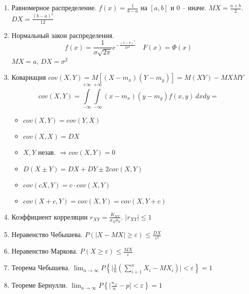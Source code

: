 \documentclass{article}
\begin{document}
\begin{multicols}{2}
\begin{enumerate}
    \item Равномерное распределение.
        $f(x) = \frac{1}{b-a}$ на $[a, b]$ и $0$ -- иначе.
        $MX = \frac{a+b}{2}$. $DX = \frac{(b-a)^2}{12}$
    \item Нормальный закон распределения.
        \[
        f(x) = \frac{1}{\sigma \sqrt{2\pi}} e^{- \frac{(x-a)^2}{2\sigma^2}}
        \quad
        F(x) = \Phi(x)
        \]
        $MX = a$, $DX = \sigma^2$
    \item Ковариация $cov(X, Y) = M[(X-m_x)(Y-m_y)] = M(XY) - MX MY$ 
        \[
            cov(X,Y) = \int\limits_{-\infty}^{+\infty}\int\limits_{-\infty}^{+\infty}(x-m_x)(y-m_y) f(x, y) \, dx dy =
        \]
        \begin{itemize}
            \item $ cov(X, Y) = cov(Y, X) $
            \item $ cov(X, X) = DX$
            \item $X, Y $ незав. $\Rightarrow cov(X, Y) = 0$
            \item $D(X \pm Y) = DX + DY \pm 2 cov(X, Y) $
            \item $cov(cX, Y) = c \cdot cov(X, Y)$
            \item $cov(X + c, Y) = cov(X, Y) = cov(X, Y + c)$
        \end{itemize}
    \item Коэффициент корреляции $r_{XY} = \frac{K_{XY}}{\sigma_X \sigma_Y}$.
        $|r_{XY}| \leq 1$
    \item Неравенство Чебышева. $P(|X - MX| \geq \varepsilon) \leq \frac{DX}{\varepsilon^2}$
    \item Неравенство Маркова. $P(X \geq \varepsilon) \leq \frac{MX}{\varepsilon}$
    \item Теорема Чебышева. $\lim_{n \to \infty} P\left\{ \Big|\frac{1}{n} \left(\sum_{i=1}^n X_i - MX_i \right)\Big| < \varepsilon \right\} = 1$
    \item Теореме Бернулли. $\lim_{n \to \infty} P \left\{ \Big| \frac{n_A}{n} - p \Big| < \varepsilon \right\} = 1$
    \end{enumerate}
\end{multicols}
\end{document}
